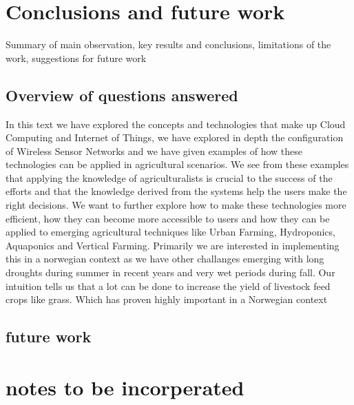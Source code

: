 \documentclass[]{uiophd}
\begin{document}
\chapter{Conclusions and future work}

Summary of main observation, key results and conclusions, limitations of the work, suggestions for future work

\section{Overview of questions answered}
In this text we have explored the concepts and technologies that make up Cloud Computing and Internet of Things, we have explored in depth the configuration of Wireless Sensor Networks and we have given examples of how these technologies can be applied in agricultural scenarios. We see from these examples that applying the knowledge of agriculturalists is crucial to the success of the efforts and that the knowledge derived from the systems help the users make the right decisions. We want to further explore how to make these technologies more efficient, how they can become more accessible to users and how they can be applied to emerging agricultural techniques like Urban Farming, Hydroponics, Aquaponics and Vertical Farming. Primarily we are interested in implementing this in a norwegian context as we have other challanges emerging with long droughts during summer in recent years and very wet periods during fall. Our intuition tells us that a lot can be done to increase the yield of livestock feed crops like grass. Which has proven highly important in a Norwegian context
\section{future work}

\chapter{notes to be incorperated}
\end{document}
